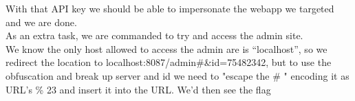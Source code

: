 {With that API key we should be able to impersonate the webapp we targeted and we are done.\\
As an extra task, we are commanded to try and access the admin site.\\
We know the only host allowed to access the admin are is ``localhost'', so we redirect the location to localhost:8087/admin\#\&id=75482342, but to use the obfuscation and break up server and id we need to "escape the \# " encoding it as URL's \% 23 and insert it into the URL. We'd then see the flag 
}